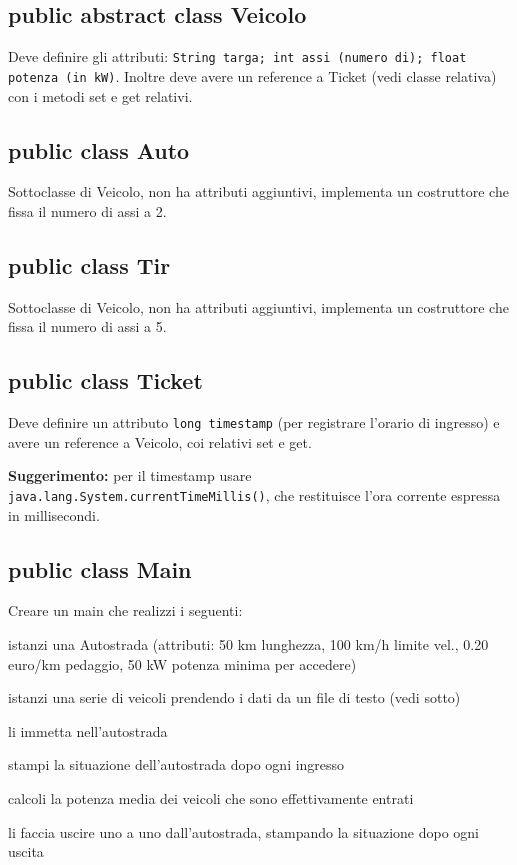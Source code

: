 \documentclass[a4paper]{article}
\begin{document}
\subsection*{public abstract class Veicolo}

Deve definire gli attributi:     \texttt{String targa;  int assi (numero di); 
float potenza (in kW)}. Inoltre deve avere un reference a Ticket (vedi classe 
relativa) con i metodi set e get relativi.


\subsection*{public class Auto}

Sottoclasse di Veicolo, non ha attributi aggiuntivi, implementa un costruttore 
che fissa il numero di assi a 2.


\subsection*{public class Tir}


Sottoclasse di Veicolo, non ha attributi aggiuntivi, implementa un costruttore 
che fissa il numero di assi a 5.


\subsection*{public class Ticket}

Deve definire un attributo  \texttt{long timestamp} (per registrare l'orario di ingresso) e 
avere un reference a Veicolo, coi relativi set e get.

\textbf{Suggerimento:} per il timestamp usare \texttt{java.lang.System.currentTimeMillis()},
che restituisce l'ora corrente espressa in millisecondi.

\subsection*{public class Main}


Creare un main che realizzi i seguenti:

\begin{compactenum}
\item istanzi una Autostrada (attributi: 50 km lunghezza, 100 km/h 
limite vel., 0.20 euro/km pedaggio, 50 kW potenza minima per accedere)
\item istanzi una serie di veicoli prendendo i dati da un file di testo (vedi 
sotto)
\item li immetta nell'autostrada
\item stampi la situazione dell'autostrada dopo ogni ingresso
\item calcoli la potenza media dei veicoli che sono effettivamente entrati
\item li faccia uscire uno a uno dall'autostrada, stampando la situazione
dopo ogni uscita
\end{compactenum}
\end{document}

